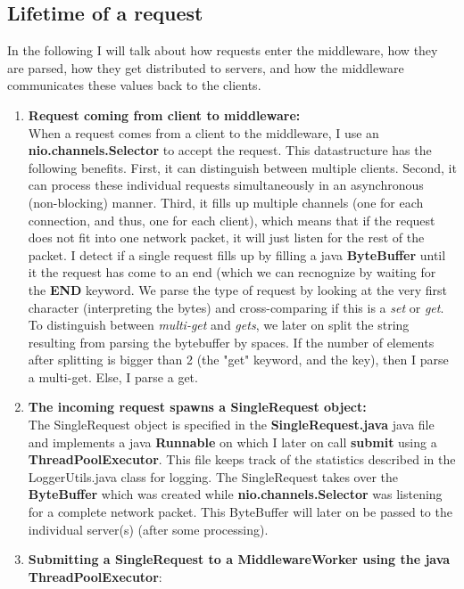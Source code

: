 \documentclass[11pt,a4paper]{article}
\begin{document}
\subsection{Lifetime of a request}
In the following I will talk about how requests enter the middleware, how they are parsed, how they get distributed to servers, and how the middleware communicates these values back to the clients. \\

\begin{enumerate}
\item \textbf{Request coming from client to middleware:}\\
When a request comes from a client to the middleware, I use an \textbf{nio.channels.Selector} to accept the request.
This datastructure has the following benefits.
First, it can distinguish between multiple clients.
Second, it can process these individual requests simultaneously in an asynchronous (non-blocking) manner.
Third, it fills up multiple channels (one for each connection, and thus, one for each client), which means that if the request does not fit into one network packet, it will just listen for the rest of the packet.
I detect if a single request fills up by filling a java \textbf{ByteBuffer} until it the request has come to an end (which we can recnognize by waiting for the \textbf{END} keyword.
We parse the type of request by looking at the very first character (interpreting the bytes) and cross-comparing if this is a \textit{set} or \textit{get}. 
To distinguish between \textit{multi-get} and \textit{gets}, we later on split the string resulting from parsing the bytebuffer by spaces.
If the number of elements after splitting is bigger than 2 (the "get" keyword, and the key), then I parse a multi-get.
Else, I parse a get.
\item \textbf{The incoming request spawns a SingleRequest object:}\\
The SingleRequest object is specified in the \textbf{SingleRequest.java} java file and implements a java \textbf{Runnable} on which I later on call \textbf{submit} using a \textbf{ThreadPoolExecutor}. 
This file keeps track of the statistics described in the LoggerUtils.java class for logging.
The SingleRequest takes over the \textbf{ByteBuffer} which was created while \textbf{nio.channels.Selector} was listening for a complete network packet.
This ByteBuffer will later on be passed to the individual server(s) (after some processing).
\item \textbf{Submitting a SingleRequest to a MiddlewareWorker using the java ThreadPoolExecutor}:\\

\end{enumerate}
\end{document}

